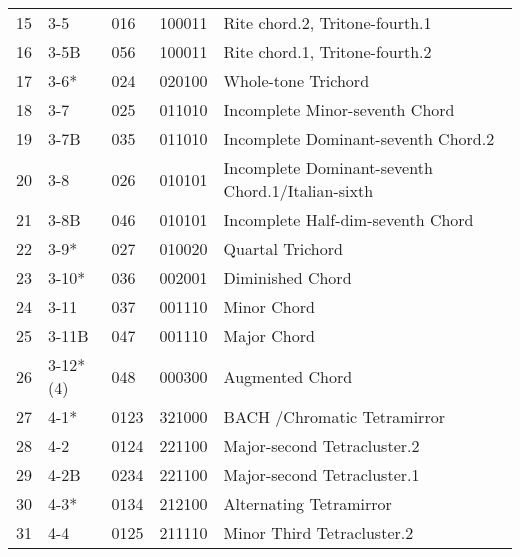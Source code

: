 \begin{table}[h]
\begin{tabular}{lllll}
15 & 3-5                            & 016   & 100011          & Rite chord.2, Tritone-fourth.1                    \\
16 & 3-5B                           & 056   & 100011          & Rite chord.1, Tritone-fourth.2                    \\
17 & 3-6*                           & 024   & 020100          & Whole-tone Trichord                               \\
18 & 3-7                            & 025   & 011010          & Incomplete Minor-seventh Chord                    \\
19 & 3-7B                           & 035   & 011010          & Incomplete Dominant-seventh Chord.2               \\
20 & 3-8                            & 026   & 010101          & Incomplete Dominant-seventh Chord.1/Italian-sixth \\
21 & 3-8B                           & 046   & 010101          & Incomplete Half-dim-seventh Chord                 \\
22 & 3-9*                           & 027   & 010020          & Quartal Trichord                                  \\
23 & 3-10*                          & 036   & 002001          & Diminished Chord                                  \\
24 & 3-11                           & 037   & 001110          & Minor Chord                                       \\
25 & 3-11B                          & 047   & 001110          & Major Chord                                       \\
26 & 3-12*(4)                       & 048   & 000300          & Augmented Chord                                   \\
27 & 4-1*                           & 0123  & 321000          & BACH /Chromatic Tetramirror                       \\
28 & 4-2                            & 0124  & 221100          & Major-second Tetracluster.2                       \\
29 & 4-2B                           & 0234  & 221100          & Major-second Tetracluster.1                       \\
30 & 4-3*                           & 0134  & 212100          & Alternating Tetramirror                           \\
31 & 4-4                            & 0125  & 211110          & Minor Third Tetracluster.2                        \\

\end{tabular}
\end{table}
